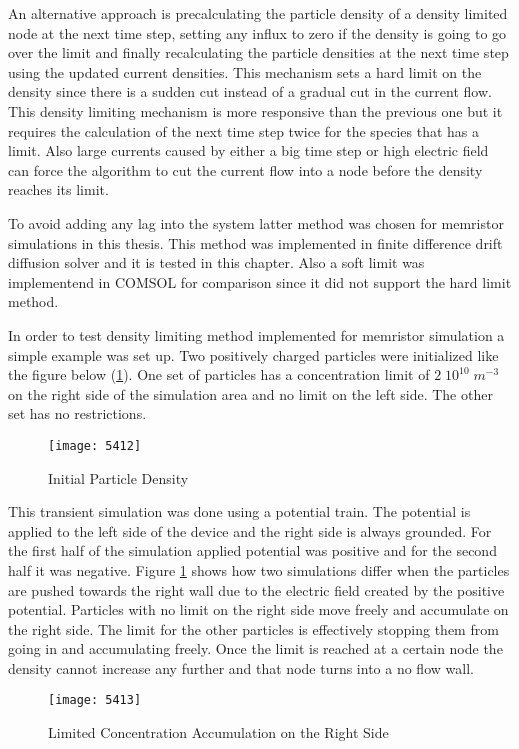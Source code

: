 An alternative approach is precalculating the particle density of a density limited node at the next time step, setting any influx to zero if the density is going to go over the limit and finally recalculating the particle densities at the next time step using the updated current densities. This mechanism sets a hard limit on the density since there is a sudden cut instead of a gradual cut in the current flow. This density limiting mechanism is more responsive than the previous one but it requires the calculation of the next time step twice for the species that has a limit. Also large currents caused by either a big time step or high electric field can force the algorithm to cut the current flow into a node before the density reaches its limit.

To avoid adding any lag into the system latter method was chosen for memristor simulations in this thesis. This method was implemented in finite difference drift diffusion solver and it is tested in this chapter. Also a soft limit was implementend in COMSOL for comparison since it did not support the hard limit method.  

In order to test density limiting method implemented for memristor simulation a simple example was set up. Two positively charged particles were initialized like the figure below (\ref{5412}). One set of particles has a concentration limit of $2 \; 10^{10} \; m^{-3}$ on the right side of the simulation area and no limit on the left side. The other set has no restrictions.
\begin{figure}[!htp]
\centering
\texttt{[image: 5412]}
\caption{Initial Particle Density} 
\label{5412}
\end{figure}

This transient simulation was done using a potential train. The potential is applied to the left side of the device and the right side is always grounded. For the first half of the simulation applied potential was positive and for the second half it was negative. Figure \ref{5412} shows how two simulations differ when the particles are pushed towards the right wall due to the electric field created by the positive potential. Particles with no limit on the right side move freely and accumulate on the right side. The limit for the other particles is effectively stopping them from going in and accumulating freely. Once the limit is reached at a certain node the density cannot increase any further and that node turns into a no flow wall. 

\begin{figure}[!htp]
\centering
\texttt{[image: 5413]}
\caption{Limited Concentration Accumulation on the Right Side} 
\label{5413}
\end{figure}

